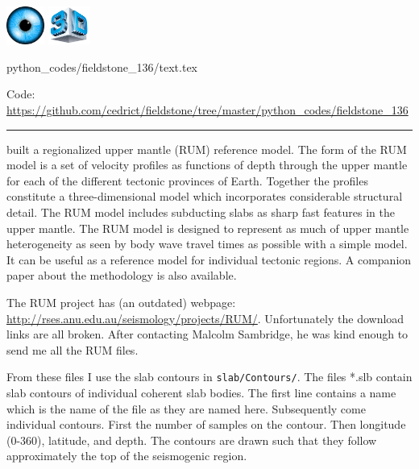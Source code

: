 \includegraphics[height=1.25cm]{images/pictograms/visualisation}
\includegraphics[height=1.25cm]{images/pictograms/3d}


\begin{flushright} {\tiny {\color{gray} python\_codes/fieldstone\_136/text.tex}} \end{flushright}

%

\begin{center}
\inpython Code: \url{https://github.com/cedrict/fieldstone/tree/master/python_codes/fieldstone_136}
\end{center}

\par\noindent\rule{\textwidth}{0.4pt}

\textcite{gusa98} built a regionalized upper mantle (RUM) reference model.
The form of the RUM model is a set of velocity
profiles as functions of depth through the upper mantle for each of the different
tectonic provinces of Earth. Together the profiles constitute a three-dimensional
model which incorporates considerable structural detail.
The RUM model includes subducting slabs as sharp fast features in the
upper mantle. The RUM model is designed
to represent as much of upper mantle heterogeneity as seen by body wave travel
times as possible with a simple model. It can be useful as a reference model for
individual tectonic regions. 
A companion paper \parencite{sagu98} about the methodology is also available.

The RUM project has (an outdated) webpage: \url{http://rses.anu.edu.au/seismology/projects/RUM/}.
Unfortunately the download links are all broken. 
After contacting Malcolm Sambridge, he was kind enough to send me all the RUM files. 

From these files I use the slab contours in {\tt slab/Contours/}. 
The files *.slb contain slab contours of individual coherent slab bodies.
The first line contains a name which is the name of the file as they are
named here.  Subsequently come individual contours.  First the number of
samples on the contour.  Then longitude (0-360), latitude, and depth.
The contours are drawn such that they follow approximately the top of
the seismogenic region.

